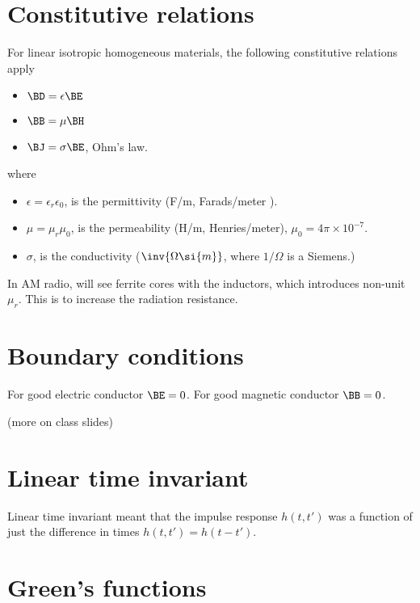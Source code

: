 \section{Constitutive relations}

For linear isotropic homogeneous materials, the following constitutive relations apply

\begin{itemize}
\item \( \BD = \epsilon \BE \)
\item \( \BB = \mu \BH \)
\item \( \BJ = \sigma \BE \), Ohm's law.
\end{itemize}

where

\begin{itemize}
\item \( \epsilon = \epsilon_r \epsilon_0\), is the permittivity (\si{F/m}, \si{Farads/meter} ).
\item \( \mu = \mu_r \mu_0 \), is the permeability (\si{H/m}, \si{Henries/meter}), \( \mu_0 = 4 \pi \times 10^{-7} \).
\item \( \sigma \), is the conductivity (\( \inv{\Omega \si{m}}\), where \( 1/\Omega \) is a Siemens.)
\end{itemize}

In AM radio, will see ferrite cores with the inductors, which introduces non-unit \( \mu_r \).  This is to increase the radiation resistance.

\section{Boundary conditions}

For good electric conductor \( \BE = 0 \).
For good magnetic conductor \( \BB = 0 \).

(more on class slides)

\section{Linear time invariant}

Linear time invariant meant that the impulse response \( h(t,t') \) was a function of just the difference in times \( h(t,t') = h(t-t') \).

\section{Green's functions}

